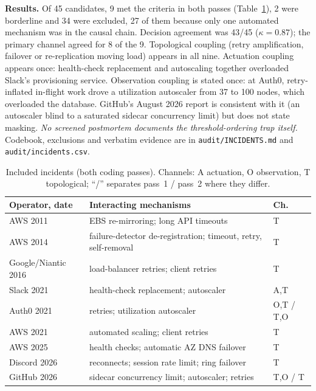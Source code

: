 \documentclass[conference]{IEEEtran}
\begin{document}
\textbf{Results.} Of 45 candidates, 9 met the criteria in both passes
(Table~\ref{tab:incidents}), 2 were borderline and 34 were excluded, 27 of
them because only one automated mechanism was in the causal chain. Decision
agreement was 43/45 ($\kappa=0.87$); the primary channel agreed for 8 of the
9. Topological coupling (retry amplification, failover or re-replication
moving load) appears in all nine. Actuation coupling appears once:
health-check replacement and autoscaling together overloaded Slack's
provisioning service. Observation coupling is stated once: at Auth0,
retry-inflated in-flight work drove a utilization autoscaler from 37 to 100
nodes, which overloaded the database. GitHub's August 2026 report is
consistent with it (an autoscaler blind to a saturated sidecar concurrency
limit) but does not state masking. \emph{No screened postmortem documents the
threshold-ordering trap itself.} Codebook, exclusions and verbatim evidence
are in \texttt{audit/INCIDENTS.md} and \texttt{audit/incidents.csv}.

\begin{table}[t]
\caption{Included incidents (both coding passes). Channels: A actuation, O
observation, T topological; ``/'' separates pass~1 / pass~2 where they differ.}
\label{tab:incidents}
\centering\footnotesize
\begin{tabular}{@{}lp{3.8cm}l@{}}
\toprule
Operator, date & Interacting mechanisms & Ch. \\
\midrule
AWS 2011 \cite{incaws2011} & EBS re-mirroring; long API timeouts & T \\
AWS 2014 \cite{incaws2014} & failure-detector de-registration; timeout, retry, self-removal & T \\
Google/Niantic 2016 \cite{srewb2018} & load-balancer retries; client retries & T \\
Slack 2021 \cite{incslack2021} & health-check replacement; autoscaler & A,T \\
Auth0 2021 \cite{incauth02021} & retries; utilization autoscaler & O,T / T,O \\
AWS 2021 \cite{incaws2021} & automated scaling; client retries & T \\
AWS 2025 \cite{incaws2025} & health checks; automatic AZ DNS failover & T \\
Discord 2026 \cite{incdiscord2026} & reconnects; session rate limit; ring failover & T \\
GitHub 2026 \cite{incgithub2026} & sidecar concurrency limit; autoscaler; retries & T,O / T \\
\bottomrule
\end{tabular}
\end{table}
\end{document}
